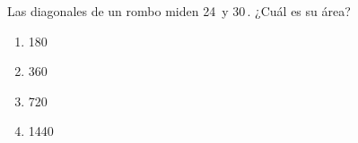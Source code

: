 \begin{problem}
    Las diagonales de un rombo miden 24\, y 30\,. ¿Cuál es su área?

    \begin{enumerate}[label=\Alph*.]
        \item 180\,
        \item 360\,
        \item 720\,
        \item 1440\,
    \end{enumerate}
\end{problem}
